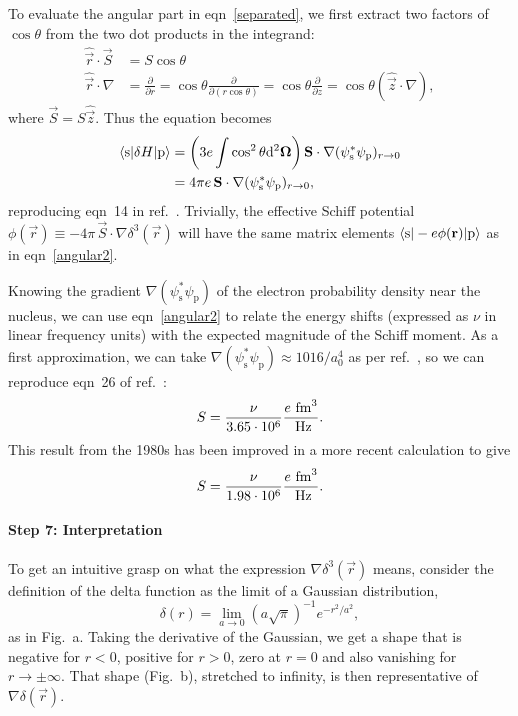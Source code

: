 To evaluate the angular part in eqn~\ref{separated}, we first extract two
factors of $\cos\theta$ from the two dot products in the integrand:
%
\begin{align*}
    \hat{\vec r}\cdot\vec S&=S\cos\theta\\
    \hat{\vec r}\cdot\nabla&=\frac{\partial}{\partial r}
    =\cos\theta\frac{\partial}{\partial(r\cos\theta)}
    =\cos\theta\frac{\partial}{\partial z}
    =\cos\theta(\hat{\vec z}\cdot\nabla),
\end{align*}
%
where $\vec S=S\hat{\vec z}$. Thus the equation becomes
%
\begin{align}
    \nonumber
    \langle\text{s}|\delta H|\text{p}\rangle
    &=
    \left(
        3e\int
        \cos^2\theta
        \mathrm{d}^2\mathbf{\Omega}
    \right)
    \mathbf{S}\cdot\nabla(\psi^*_\text{s}\psi_\text{p})_{r\to0}\\
    \label{angular2}
    &=4\pi e\,\mathbf{S}\cdot\nabla(\psi^*_\text{s}\psi_\text{p})_{r\to0},
\end{align}
%
reproducing eqn~14 in ref.~\cite{flambaum2002nuclear}. Trivially, the effective
Schiff potential $\phi(\vec r)\equiv-4\pi\,\vec S\cdot\nabla\delta^3(\vec r)$
will have the same matrix elements $\langle\text{s}|-e\phi(\mathbf{r})|\text{p}\rangle$
as in eqn~\ref{angular2}.

Knowing the gradient $\nabla(\psi^*_\text{s}\psi_\text{p})$ of the electron
probability density near the nucleus, we can use eqn~\ref{angular2} to relate
the energy shifts (expressed as $\nu$ in linear frequency units) with the
expected magnitude of the Schiff moment. As a first approximation, we can take
$\nabla(\psi^*_\text{s}\psi_\text{p})\approx1016/a_0^4$ as per
ref.~\cite{coveney1983parity}, so we can reproduce eqn~26 of
ref.~\cite{cho1991search}:
%
\begin{equation}
    S=\frac{\nu}{3.65\cdot10^6}\frac{e~\mathrm{fm}^3}{~\mathrm{Hz}}.
\end{equation}
%
This result from the 1980s has been improved in a more recent calculation
\cite[eqn~22]{dzuba2002electric} to give
%
\begin{equation}
    \label{schiffnumbers}
    S=\frac{\nu}{1.98\cdot10^6}\frac{e~\mathrm{fm}^3}{~\mathrm{Hz}}.
\end{equation}

\paragraph{Step 7: Interpretation}

To get an intuitive grasp on what the expression $\nabla\delta^3(\vec r)$ means,
consider the definition of the delta function as the limit of a Gaussian
distribution,
%
\[
    \delta(r)=\lim\limits_{a\to0}(a\sqrt\pi)^{-1}e^{-r^2/a^2},
\]
%
as in Fig.~a. Taking the derivative of the Gaussian, we get a
shape that is negative for $r<0$, positive for $r>0$, zero at $r=0$ and also
vanishing for $r\to\pm\infty$. That shape (Fig.~b), stretched to
infinity,  is then representative of $\nabla\delta(\vec r)$.

